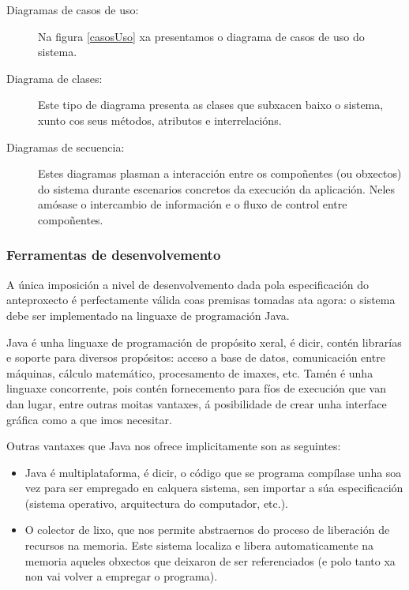 \begin{description}
\item[Diagramas de casos de uso:] Na figura \ref{casosUso} xa presentamos o diagrama de casos de uso do sistema.
\item[Diagrama de clases:] Este tipo de diagrama presenta as clases que subxacen baixo o sistema, xunto cos seus métodos, atributos e interrelacións.
\item[Diagramas de secuencia:] Estes diagramas plasman a interacción entre os compoñentes (ou obxectos) do sistema durante escenarios concretos da execución da aplicación. Neles amósase o intercambio de información e o fluxo de control entre compoñentes.
\end{description} 

\subsubsection{Ferramentas de desenvolvemento}

A única imposición a nivel de desenvolvemento dada pola especificación do anteproxecto é perfectamente válida coas premisas tomadas ata agora: o sistema debe ser implementado na linguaxe de programación Java.


Java é unha linguaxe de programación de propósito xeral, é dicir, contén librarías e soporte para diversos propósitos: acceso a base de datos, comunicación entre máquinas, cálculo matemático, procesamento de imaxes, etc. Tamén é unha linguaxe concorrente, pois contén fornecemento para fíos de execución que van dan lugar, entre outras moitas vantaxes, á posibilidade de crear unha interface gráfica como a que imos necesitar.

Outras vantaxes que Java nos ofrece implicitamente son as seguintes:

\begin{itemize}
\item Java é multiplataforma, é dicir, o código que se programa compílase unha soa vez para ser empregado en calquera sistema, sen importar a súa especificación (sistema operativo, arquitectura do computador, etc.).
\item O colector de lixo, que nos permite abstraernos do proceso de liberación de recursos na memoria. Este sistema localiza e libera automaticamente na memoria aqueles obxectos que deixaron de ser referenciados (e polo tanto xa non vai volver a empregar o programa).
\end{itemize} 

